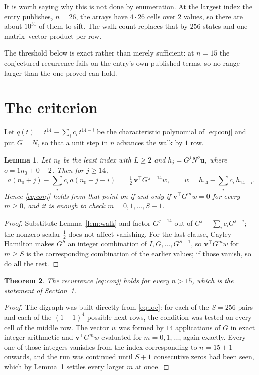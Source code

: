 \documentclass[11pt,a4paper]{article}
\theoremstyle{plain}
\newtheorem{theorem}{Theorem}
\newtheorem{lemma}[theorem]{Lemma}
\theoremstyle{definition}
\begin{document}
It is worth saying why this is not done by enumeration. At the largest index the entry
publishes, $n=26$, the arrays have $4\cdot26$ cells over
$2$ values, so there are about $10^{31}$ of them to sift. The
walk count replaces that by $256$ states and one matrix--vector product per row.

The threshold below is exact rather than merely sufficient: at $n=15$ the conjectured
recurrence fails on the entry's own published terms, so no range larger than the one proved
can hold.
\section{The criterion}

Let $q(t)=t^{14}-\sum_i c_i\,t^{14-i}$ be the characteristic polynomial of
\eqref{eq:conj} and put $G=N$, so that a unit step in $n$ advances the walk by
$1$ row.

\begin{lemma}\label{lem:crit}
Let $n_0$ be the least index with $L\ge2$ and $h_j=G^{j}N^{o}\mathbf{u}$, where
$o=1n_0+0-2$. Then for $j\ge14$,
\[
a(n_0+j)-\sum_i c_i\,a(n_0+j-i)\;=\;\tfrac1{2}\,\mathbf{v}^{\!\top}G^{\,j-14}w,
\qquad w=h_{14}-\sum_i c_i\,h_{14-i} .
\]
Hence \eqref{eq:conj} holds from that point on if and only if
$\mathbf{v}^{\!\top}G^{m}w=0$ for every $m\ge0$, and it is enough to check
$m=0,1,\dots,S-1$.
\end{lemma}

\begin{proof}
Substitute Lemma~\ref{lem:walk} and factor $G^{j-14}$ out of
$G^{j}-\sum_ic_iG^{j-i}$; the nonzero scalar $\tfrac1{2}$ does not affect
vanishing. For the last clause, Cayley--Hamilton makes $G^{S}$ an integer combination of
$I,G,\dots,G^{S-1}$, so $\mathbf{v}^{\!\top}G^{m}w$ for $m\ge S$ is the corresponding
combination of the earlier values; if those vanish, so do all the rest.
\end{proof}

\begin{theorem}
The recurrence \eqref{eq:conj} holds for every $n>15$, which is the statement of
Section~1.
\end{theorem}

\begin{proof}
The digraph was built directly from \eqref{eq:loc}: for each of the $S=256$ pairs and each
of the $(1+1)^{4}$ possible next rows, the condition was tested on every cell of
the middle row. The vector $w$ was formed by $14$ applications of $G$ in exact integer
arithmetic and $\mathbf{v}^{\!\top}G^{m}w$ evaluated for $m=0,1,\dots$, again exactly.
Every one of those integers vanishes from the index corresponding to $n=15+1$ onwards,
and the run was continued until $S+1$ consecutive zeros had been seen, which by
Lemma~\ref{lem:crit} settles every larger $m$ at once.
\end{proof}
\end{document}
